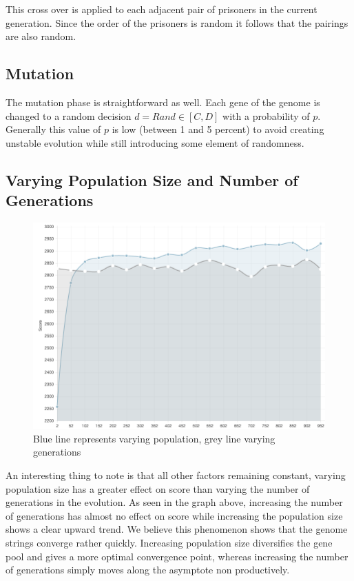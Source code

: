 \documentclass[12pt]{article}
\begin{document}
This cross over is applied to each adjacent pair of prisoners in the current
generation.  Since the order of the prisoners is random it follows that the pairings
are also random.

\subsection{Mutation}
\label{mutation}

The mutation phase is straightforward as well.  Each gene of the genome is changed
to a random decision $d = Rand \in [C, D]$ with a probability of $p$.  Generally
this value of $p$ is low (between 1 and 5 percent) to avoid creating unstable
evolution while still introducing some element of randomness.

\pagebreak

\subsection{Varying Population Size and Number of Generations}
\label{vpg}
\begin{figure}[h!]
    \caption{Blue line represents varying population, grey line varying generations}
    \centering
    \includegraphics[scale=0.5]{figures/gen_pop_compare}
\end{figure}

An interesting thing to note is that all other factors remaining constant,
varying population size has a greater effect on score than varying the number
of generations in the evolution. As seen in the graph above, increasing the number
of generations has almost no effect on score while increasing the population
size shows a clear upward trend.  We believe this phenomenon shows that the genome
strings converge rather quickly.  Increasing population size diversifies
the gene pool and gives a more optimal convergence point, whereas increasing
the number of generations simply moves along the asymptote non productively.
\end{document}
